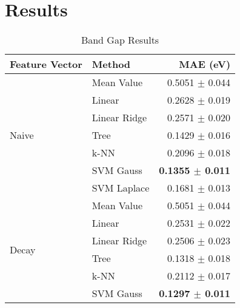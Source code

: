 \documentclass[10pt]{article}
\begin{document}
\nocite{ruddigkeit_enumeration_2012}
\nocite{darley_beyond_2008}
\nocite{frisch_gaussian_2009}
\nocite{montavon_machine_2013}
\nocite{handley_dynamically_2009}
\nocite{hansen_assessment_2013}
\nocite{schutt_how_2013}
\nocite{reymond_exploring_2012}
\nocite{whitfield_computational_2013}
\nocite{hansen_assessment_2013-1}
\nocite{ra_dft_2008}
\nocite{martell_assessment_1997}
\nocite{montavon_learning_2012}
\nocite{domingos_few_2012}
\nocite{martin_benchmark_1997}
\nocite{handley_potential_2010}
\nocite{rupp_fast_2012}


\newpage
\appendix

\section{Results}

\begin{table}[H]
  \centering
  \caption{Band Gap Results}
  \begin{tabular}{llr}
            Feature Vector     & Method       & MAE (eV)                \\
    \hline\hline
    \multirow{7}{*}{Naive}     & Mean Value   & 0.5051 $\pm$ 0.044 \\
                               & Linear       & 0.2628 $\pm$ 0.019 \\
                               & Linear Ridge & 0.2571 $\pm$ 0.020 \\
                               & Tree         & 0.1429 $\pm$ 0.016 \\
                               & k-NN         & 0.2096 $\pm$ 0.018 \\
                               & SVM Gauss    & \textbf{0.1355 $\pm$ 0.011} \\
                               & SVM Laplace  & 0.1681 $\pm$ 0.013 \\
    \hline
    \multirow{7}{*}{Decay}     & Mean Value   & 0.5051 $\pm$ 0.044 \\
                               & Linear       & 0.2531 $\pm$ 0.022 \\
                               & Linear Ridge & 0.2506 $\pm$ 0.023 \\
                               & Tree         & 0.1318 $\pm$ 0.018 \\
                               & k-NN         & 0.2112 $\pm$ 0.017 \\
                               & SVM Gauss    & \textbf{0.1297 $\pm$ 0.011} \\

\end{tabular}
\end{table}
\end{document}
